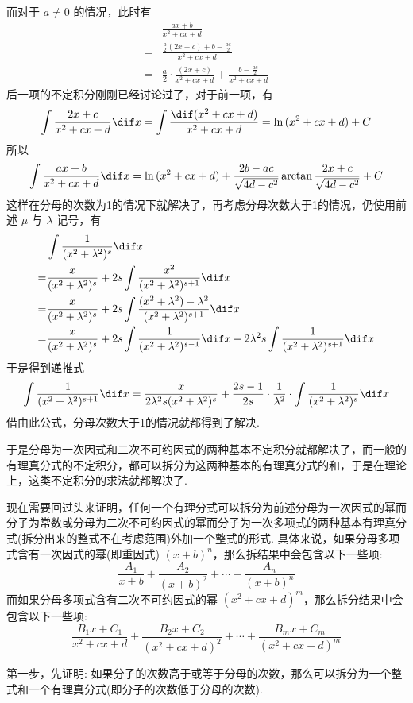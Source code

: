 而对于 $a \neq 0$ 的情况，此时有
\begin{align*}
    & \frac{ax+b}{x^2+cx+d} \\
    = & \frac{\frac{a}{2}(2x+c)+b-\frac{ac}{2}}{x^2+cx+d} \\
    = & \frac{a}{2} \cdot \frac{(2x+c)}{x^2+cx+d} + \frac{b-\frac{ac}{2}}{x^2+cx+d}
\end{align*}
后一项的不定积分刚刚已经讨论过了，对于前一项，有
\[ \int \frac{2x+c}{x^2+cx+d} \dif x = \int \frac{\dif (x^2+cx+d)}{x^2+cx+d} = \ln{(x^2+cx+d)} + C \]
所以
\[ \int \frac{ax+b}{x^2+cx+d} \dif x = \ln{(x^2+cx+d)} + \frac{2b-ac}{\sqrt{4d-c^{2}}} \arctan{\frac{2x+c}{\sqrt{4d-c^2}}} + C \]
这样在分母的次数为1的情况下就解决了，再考虑分母次数大于1的情况，仍使用前述 $\mu$ 与 $\lambda$ 记号，有
\begin{align*}
  & \int \frac{1}{(x^2+\lambda^2)^s} \dif x \\
  = & \frac{x}{(x^2+\lambda^2)^s}+2s \int \frac{x^2}{(x^2+\lambda^2)^{s+1}} \dif x \\
  = & \frac{x}{(x^2+\lambda^2)^s}+2s \int \frac{(x^2+\lambda^2)-\lambda^2}{(x^2+\lambda^2)^{s+1}} \dif x \\
  = & \frac{x}{(x^2+\lambda^2)^s}+2s \int \frac{1}{(x^2+\lambda^2)^{s-1}} \dif x -2\lambda^2s \int \frac{1}{(x^2+\lambda^2)^{s+1}} \dif x \\
\end{align*}
于是得到递推式
\[ \int \frac{1}{(x^2+\lambda^2)^{s+1}} \dif x = \frac{x}{2\lambda^2s (x^2+\lambda^2)^s} + \frac{2s-1}{2s} \cdot \frac{1}{\lambda^2} \cdot \int \frac{1}{(x^2+\lambda^2)^s} \dif x \]
借由此公式，分母次数大于1的情况就都得到了解决.

于是分母为一次因式和二次不可约因式的两种基本不定积分就都解决了，而一般的有理真分式的不定积分，都可以拆分为这两种基本的有理真分式的和，于是在理论上，这类不定积分的求法就都解决了.

现在需要回过头来证明，任何一个有理分式可以拆分为前述分母为一次因式的幂而分子为常数或分母为二次不可约因式的幂而分子为一次多项式的两种基本有理真分式(拆分出来的整式不在考虑范围)外加一个整式的形式. 具体来说，如果分母多项式含有一次因式的幂(即重因式) $(x+b)^n$，那么拆结果中会包含以下一些项:
\[ \frac{A_{1}}{x+b} + \frac{A_{2}}{(x+b)^{2}} + \cdots + \frac{A_{n}}{(x+b)^n} \]
而如果分母多项式含有二次不可约因式的幂 $(x^2+cx+d)^m$，那么拆分结果中会包含以下一些项:
\[ \frac{B_{1}x+C_{1}}{x^2+cx+d} + \frac{B_{2}x+C_{2}}{(x^2+cx+d)^{2}} + \cdots + \frac{B_{m}x+C_{m}}{(x^2+cx+d)^{m}} \]

第一步，先证明: 如果分子的次数高于或等于分母的次数，那么可以拆分为一个整式和一个有理真分式(即分子的次数低于分母的次数).

